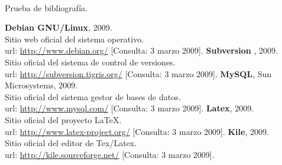 \paragraph{}Prueba de bibliografía.

\begin{thebibliography}{xx}

 \textbf{Debian GNU/Linux}, 2009.\\
         Sitio web oficial del sistema operativo.\\
         url: \url{http://www.debian.org/}
         [Consulta: 3 marzo 2009].
 \textbf{Subversion} , 2009.\\
         Sitio oficial del sistema de control de versiones.\\
         url: \url{http://subversion.tigris.org/}
         [Consulta: 3 marzo 2009].
 \textbf{MySQL}, Sun Microsystems, 2009.\\
         Sitio oficial del sistema gestor de bases de datos.\\
         url: \url{http://www.mysql.com/}
         [Consulta: 3 marzo 2009].
 \textbf{Latex}, 2009.\\
         Sitio oficial del proyecto \LaTeX.\\
         url: \url{http://www.latex-project.org/}
         [Consulta: 3 marzo 2009].
 \textbf{Kile}, 2009.\\
         Sitio oficial del editor de Tex/Latex.\\
         url: \url{http://kile.sourceforge.net/}
         [Consulta: 3 marzo 2009].
 \end{thebibliography}